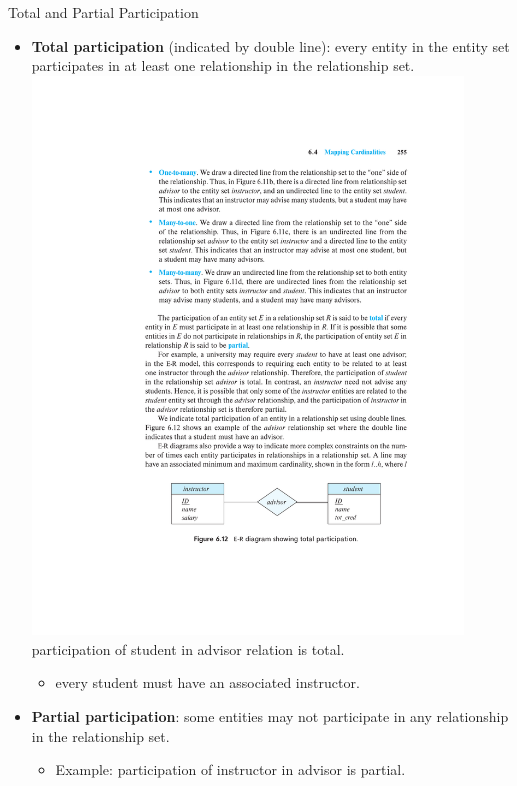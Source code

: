 \documentclass{beamer}
\begin{document}
\begin{frame}{Total and Partial Participation}
    \begin{itemize}
        \item \textbf{Total participation} (indicated by double line): every entity in the entity set participates in at least one relationship in the relationship set. \\
        \includegraphics[trim={6cm 5.5cm 4cm 19.75cm}, clip, width=0.9\textwidth]{figures/p255}\\
        participation of student in advisor relation is total.
        \begin{itemize}
            \item every student must have an associated instructor.
        \end{itemize}
        \item \textbf{Partial participation}: some entities may not participate in any relationship in the relationship set.
        \begin{itemize}
            \item Example: participation of instructor in advisor is partial.
        \end{itemize}
    \end{itemize}
\end{frame}
\end{document}
